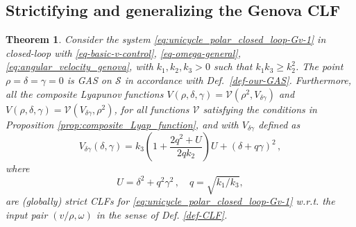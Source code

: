 \documentclass[journal,twoside,web]{ieeecolor}
\newtheorem{theorem}{Theorem}
\theoremstyle{definition}
\begin{document}
\subsection{Strictifying and generalizing the Genova CLF}
\label{sec-strictify}

\begin{theorem}%
\label{thm:unicycle_CLF_polynomial}
Consider the system 
\eqref{eq:unicycle_polar_closed_loop-Gv-1} in closed-loop with \eqref{eq-basic-v-control}, \eqref{eq-omega-general},  \eqref{eq:angular_velocity_genova}, 
with $k_1, k_2, k_3 > 0$ such that
$k_1 k_3\geq k_2^2$. 
The point $\rho = \delta = \gamma = 0$ is GAS on $\mathcal{S}$ in accordance with Def.~\ref{def-our-GAS}.
Furthermore, all the composite Lyapunov functions $V(\rho, \delta, \gamma) = \mathcal{V}(\rho^2, V_{\delta \gamma})$ and $V(\rho, \delta, \gamma) = \mathcal{V}(V_{\delta \gamma},\rho^2)$, for all functions $\mathcal{V}$ satisfying the conditions in Proposition \ref{prop:composite_Lyap_function}, and with $V_{\delta \gamma}$ defined as
\begin{equation}
\label{eq:CLF_polynomial_delta_gamma}
V_{\delta \gamma}(\delta,\gamma) =  k_3  \left(1+
\frac{2q^2+U}{2qk_2}\right)U
+   (\delta+q\gamma)^2 \,,
\end{equation}
where 
\begin{equation}
U=\delta^2+ q^2 \gamma^2\,, \quad q = \sqrt{k_1/k_3}, \label{eq:U_genova}  
\end{equation}
are (globally) strict CLFs for \eqref{eq:unicycle_polar_closed_loop-Gv-1} w.r.t. the input pair $(v/\rho,\omega)$ in the sense of Def. \ref{def-CLF}. 
\end{theorem}
\end{document}
